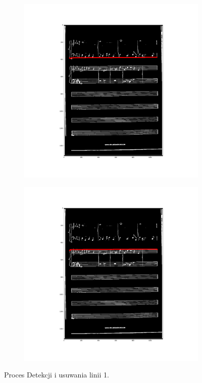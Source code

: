 \documentclass[12pt]{article}
\begin{document}
\begin{figure}[h!]
\begin{subfigure}[b]{0.32\linewidth}
		\end{subfigure}
		\begin{subfigure}[b]{0.32\linewidth}
			\includegraphics[width=\linewidth]{zdj/BFS10.png}
		\end{subfigure}
		\begin{subfigure}[b]{0.32\linewidth}
			\includegraphics[width=\linewidth]{zdj/BFS11.png}
		\end{subfigure}
		\caption{Proces Detekcji i usuwania linii 1.}
		\label{fig:bfs1}
	\end{figure}
\end{document}
